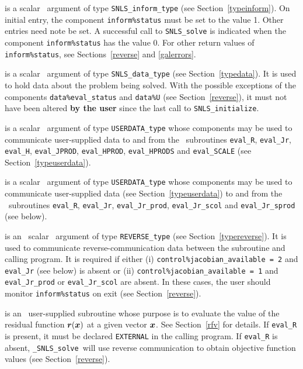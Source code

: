 \documentclass{galahad}
\newcommand{\packagename}{SNLS}
\newcommand{\fullpackagename}{\libraryname\_\packagename}
\newcommand{\solver}{{\tt \fullpackagename\_solve}}
\begin{document}
\begin{description}
 is a scalar \intentinout\ argument of type
{\tt \packagename\_inform\_type}
(see Section~\ref{typeinform}).
On initial entry, the  component {\tt inform\%status} must be set to the
value 1. Other entries need note be set.
A successful call to
{\tt \packagename\_solve}
is indicated when the  component {\tt inform\%status} has the value 0.
For other return values of {\tt inform\%status}, see
Sections~\ref{reverse} and \ref{galerrors}.

 is a scalar \intentinout\ argument of type
{\tt \packagename\_data\_type}
(see Section~\ref{typedata}). It is used to hold data about the problem being
solved. With the possible exceptions of the components
{\tt data\%eval\_status} and {\tt data\%U} (see Section~\ref{reverse}),
it must not have been altered {\bf by the user} since the last call to
{\tt \packagename\_initialize}.

 is a scalar \intentinout\ argument of type
{\tt USERDATA\_type} whose components may be used
to communicate user-supplied data to and from the \optional\ subroutines
{\tt eval\_R}, {\tt eval\_Jr}, {\tt eval\_H}, {\tt eval\_JPROD},
{\tt eval\_HPROD}, {\tt eval\_HPRODS} and {\tt eval\_SCALE}
(see Section~\ref{typeuserdata}).

 is a scalar \intentinout\ argument of type
{\tt USERDATA\_type} whose components may be used
to communicate user-supplied data (see Section~\ref{typeuserdata})
to and from the \optional\ subroutines
 {\tt eval\_R}, {\tt eval\_Jr},
 {\tt eval\_Jr\_prod}, {\tt eval\_Jr\_scol} and {\tt eval\_Jr\_sprod} 
(see below).

 is an \optional\ scalar \intentinout\ argument of type
{\tt REVERSE\_type}
(see Section~\ref{typereverse}).
It is used to communicate reverse-communication data between the
subroutine and calling program. It is required if either 
(i) {\tt control\%jacobian\_available = 2} and {\tt eval\_Jr} 
(see below) is absent or 
(ii) {\tt control\%jacobian\_available = 1} and 
{\tt eval\_Jr\_prod} or {\tt eval\_Jr\_scol} are absent.
In these cases, the user should monitor {\tt inform\%status} on exit
(see Section~\ref{reverse}).

 is an \optional\
user-supplied subroutine whose purpose is to evaluate the value of the
residual function ${\bm{r}}({\bm{x}})$ at a given vector ${\bm{x}}$.
See Section~\ref{rfv} for details.
If {\tt eval\_R} is present,
it must be declared {\tt EXTERNAL} in the calling program.
If {\tt eval\_R} is absent, \solver\ will use reverse communication to
obtain objective function values (see Section~\ref{reverse}).


\end{description}
\end{document}
